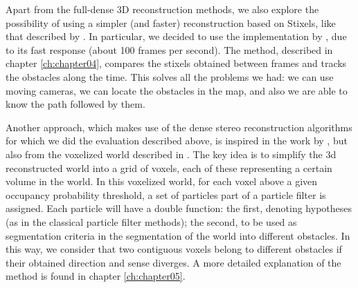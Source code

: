 Apart from the full-dense 3D reconstruction methods, we also explore the possibility of using a simpler (and faster) reconstruction based on Stixels, like that described by \cite{badino2009stixel}. In particular, we decided to use the implementation by \cite{benenson2012pedestrian}, due to its fast response (about 100 frames per second). The method, described in chapter \ref{ch:chapter04}, compares the stixels obtained between frames and tracks the obstacles along the time. This solves all the problems we had: we can use moving cameras, we can locate the obstacles in the map, and also we are able to know the path followed by them.

Another approach, which makes use of the dense stereo reconstruction algorithms for which we did the evaluation described above, is inspired in the work by \cite{danescu2012particle}, but also from the voxelized world described in \cite{broggi2013}. The key idea is to simplify the 3d reconstructed world into a grid of voxels, each of these representing a certain volume in the world. In this voxelized world, for each voxel above a given occupancy probability threshold, a set of particles part of a particle filter is assigned. Each particle will have a double function: the first, denoting hypotheses (as in the classical particle filter methods); the second, to be used as segmentation criteria in the segmentation of the world into different obstacles. In this way, we consider that two contiguous voxels belong to different obstacles if their obtained direction and sense diverges. A more detailed explanation of the method is found in chapter \ref{ch:chapter05}.

